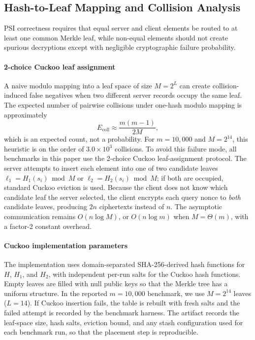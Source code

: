 \documentclass[preprint,12pt]{elsarticle}
\begin{document}
\subsection{Hash-to-Leaf Mapping and Collision Analysis}
\label{subsec:collision}

PSI correctness requires that equal server and client elements be routed to at
least one common Merkle leaf, while non-equal elements should not create
spurious decryptions except with negligible cryptographic failure probability.

\paragraph{2-choice Cuckoo leaf assignment}
A naive modulo mapping into a leaf space of size $M=2^L$ can create
collision-induced false negatives when two different server records occupy the
same leaf. The expected number of pairwise collisions under one-hash modulo
mapping is approximately
\[
  E_{\text{coll}} \approx \frac{m(m-1)}{2M},
\]
which is an expected count, not a probability. For $m=10{,}000$ and
$M=2^{14}$, this heuristic is on the order of $3.0\times 10^3$ collisions.
To avoid this failure mode, all benchmarks in this paper use the 2-choice
Cuckoo leaf-assignment protocol. The server attempts to insert each element
into one of two candidate leaves
$\ell_1 = H_1(s_i) \bmod M$ or $\ell_2 = H_2(s_i) \bmod M$; if both are
occupied, standard Cuckoo eviction is used. Because the client does not know
which candidate leaf the server selected, the client encrypts each query nonce
to \emph{both} candidate leaves, producing $2n$ ciphertexts instead of $n$.
The asymptotic communication remains $O(n\log M)$, or $O(n\log m)$ when
$M=\Theta(m)$, with a factor-2 constant overhead.

\paragraph{Cuckoo implementation parameters}
The implementation uses domain-separated SHA-256-derived hash functions for
$H$, $H_1$, and $H_2$, with independent per-run salts for the Cuckoo hash
functions. Empty leaves are filled with null public keys so that the
Merkle tree has a uniform structure. In the reported $m=10{,}000$ benchmark,
we use $M=2^{14}$ leaves ($L=14$). If Cuckoo insertion fails, the table is
rebuilt with fresh salts and the failed attempt is recorded by the benchmark
harness. The artifact records the leaf-space size, hash salts, eviction bound,
and any stash configuration used for each benchmark run, so that the placement
step is reproducible.
\end{document}
